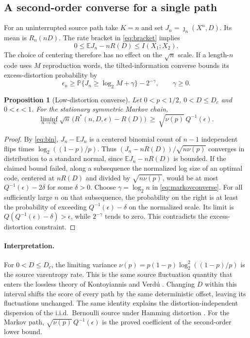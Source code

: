 \documentclass[11pt,letterpaper]{article}
\newtheorem{proposition}[theorem]{Proposition}
\theoremstyle{definition}
\newcommand{\E}{\mathbb E}
\newcommand{\Prb}{\mathbb P}
\newcommand{\jj}{\jmath}
\begin{document}
\subsection{A second-order converse for a single path}\label{sec:operational}
For an uninterrupted source path take $K=n$ and set $J_n=\jj_n(X^n,D)$. Its mean is $R_n(nD)$. The rate bracket in \eqref{eq:bracket} implies
\[
 0\le \E J_n-nR(D)\le I(X_1;X_2).
\]
The choice of centering therefore has no effect on the $\sqrt n$ scale. If a length-$n$ code uses $M$ reproduction words, the tilted-information converse \cite[Thm.~7]{kv} bounds its excess-distortion probability by
\begin{equation}
 \epsilon_n\ge\Prb\{J_n\ge\log_2 M+\gamma\}-2^{-\gamma},\qquad\gamma\ge0 .
 \label{eq:markovconverse}
\end{equation}

\begin{proposition}[Low-distortion converse]\label{prop:converse}
Let $0<p<1/2$, $0<D\le D_c$ and $0<\epsilon<1$. For the stationary symmetric Markov chain,
\[
 \liminf_{n\to\infty}\sqrt n\,\bigl(R^*(n,D,\epsilon)-R(D)\bigr)
 \ \ge\ \sqrt{\nu(p)}\,Q^{-1}(\epsilon).
\]
\end{proposition}
\begin{proof}
By \eqref{eq:bin}, $J_n-\E J_n$ is a centered binomial count of $n-1$ independent flips times $\log_2((1-p)/p)$. Thus $(J_n-nR(D))/\sqrt{n\nu(p)}$ converges in distribution to a standard normal, since $\E J_n-nR(D)$ is bounded. If the claimed bound failed, along a subsequence the normalized log size of an optimal code, centered at $nR(D)$ and divided by $\sqrt{n\nu(p)}$, would be at most $Q^{-1}(\epsilon)-2\delta$ for some $\delta>0$. Choose $\gamma=\log_2 n$ in \eqref{eq:markovconverse}. For all sufficiently large $n$ on that subsequence, the probability on the right is at least the probability of exceeding $Q^{-1}(\epsilon)-\delta$ on the normalized scale. Its limit is $Q(Q^{-1}(\epsilon)-\delta)>\epsilon$, while $2^{-\gamma}$ tends to zero. This contradicts the excess-distortion constraint.
\end{proof}

\paragraph{Interpretation.}
For $0<D\le D_c$, the limiting variance $\nu(p)=p(1-p)\log_2^2((1-p)/p)$ is the source varentropy rate. This is the same source fluctuation quantity that enters the lossless theory of Kontoyiannis and Verd\'u \cite{kontoverdu}. Changing $D$ within this interval shifts the score of every path by the same deterministic offset, leaving its fluctuations unchanged. The same identity explains the distortion-independent dispersion of the i.i.d.\ Bernoulli source under Hamming distortion \cite{kv}. For the Markov path, $\sqrt{\nu(p)}\,Q^{-1}(\epsilon)$ is the proved coefficient of the second-order lower bound.
\end{document}
